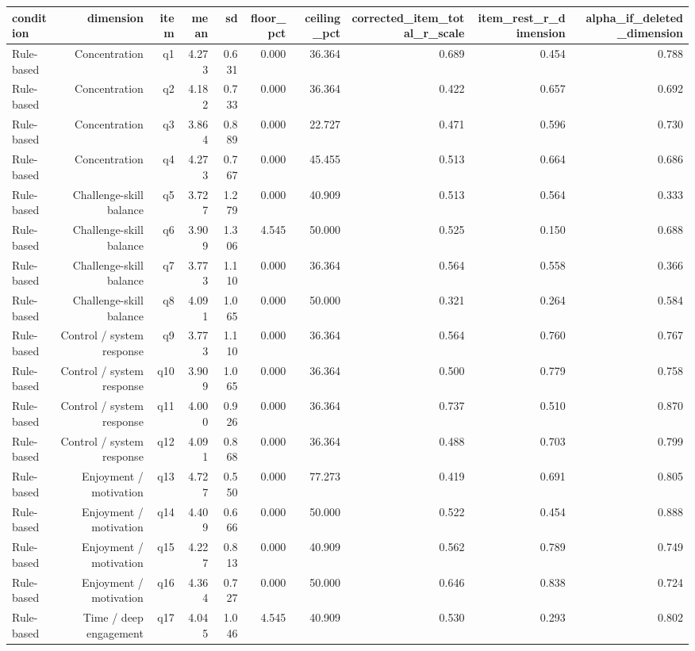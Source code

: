 \documentclass[10pt]{article}
\begin{document}
{\scriptsize\setlength{\tabcolsep}{3pt}\begin{longtable}{lrrrrrrrrr}
\toprule
condition & dimension & item & mean & sd & floor\_pct & ceiling\_pct & corrected\_item\_total\_r\_scale & item\_rest\_r\_dimension & alpha\_if\_deleted\_dimension \\
\midrule
\endhead
Rule-based & Concentration & q1 & 4.273 & 0.631 & 0.000 & 36.364 & 0.689 & 0.454 & 0.788 \\
Rule-based & Concentration & q2 & 4.182 & 0.733 & 0.000 & 36.364 & 0.422 & 0.657 & 0.692 \\
Rule-based & Concentration & q3 & 3.864 & 0.889 & 0.000 & 22.727 & 0.471 & 0.596 & 0.730 \\
Rule-based & Concentration & q4 & 4.273 & 0.767 & 0.000 & 45.455 & 0.513 & 0.664 & 0.686 \\
Rule-based & Challenge-skill balance & q5 & 3.727 & 1.279 & 0.000 & 40.909 & 0.513 & 0.564 & 0.333 \\
Rule-based & Challenge-skill balance & q6 & 3.909 & 1.306 & 4.545 & 50.000 & 0.525 & 0.150 & 0.688 \\
Rule-based & Challenge-skill balance & q7 & 3.773 & 1.110 & 0.000 & 36.364 & 0.564 & 0.558 & 0.366 \\
Rule-based & Challenge-skill balance & q8 & 4.091 & 1.065 & 0.000 & 50.000 & 0.321 & 0.264 & 0.584 \\
Rule-based & Control / system response & q9 & 3.773 & 1.110 & 0.000 & 36.364 & 0.564 & 0.760 & 0.767 \\
Rule-based & Control / system response & q10 & 3.909 & 1.065 & 0.000 & 36.364 & 0.500 & 0.779 & 0.758 \\
Rule-based & Control / system response & q11 & 4.000 & 0.926 & 0.000 & 36.364 & 0.737 & 0.510 & 0.870 \\
Rule-based & Control / system response & q12 & 4.091 & 0.868 & 0.000 & 36.364 & 0.488 & 0.703 & 0.799 \\
Rule-based & Enjoyment / motivation & q13 & 4.727 & 0.550 & 0.000 & 77.273 & 0.419 & 0.691 & 0.805 \\
Rule-based & Enjoyment / motivation & q14 & 4.409 & 0.666 & 0.000 & 50.000 & 0.522 & 0.454 & 0.888 \\
Rule-based & Enjoyment / motivation & q15 & 4.227 & 0.813 & 0.000 & 40.909 & 0.562 & 0.789 & 0.749 \\
Rule-based & Enjoyment / motivation & q16 & 4.364 & 0.727 & 0.000 & 50.000 & 0.646 & 0.838 & 0.724 \\
Rule-based & Time / deep engagement & q17 & 4.045 & 1.046 & 4.545 & 40.909 & 0.530 & 0.293 & 0.802 \\

\end{longtable}}
\end{document}
